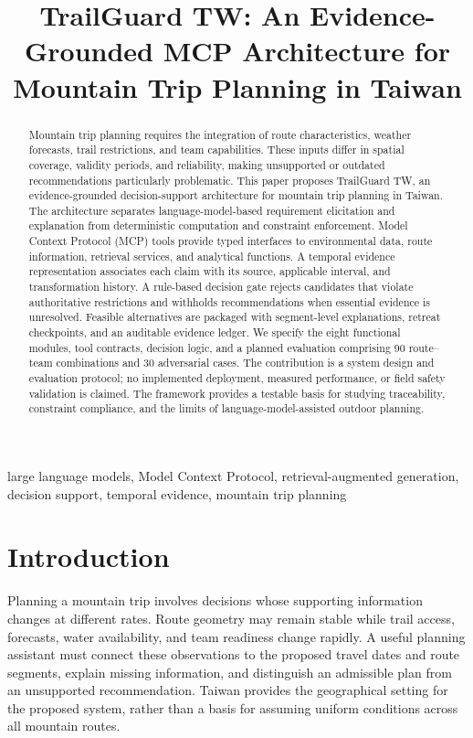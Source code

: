 \documentclass[conference]{IEEEtran}
\begin{document}
\title{TrailGuard TW: An Evidence-Grounded MCP Architecture for Mountain Trip Planning in Taiwan}
\author{
}
\maketitle
\begin{abstract}
Mountain trip planning requires the integration of route characteristics, weather forecasts, trail restrictions, and team capabilities. These inputs differ in spatial coverage, validity periods, and reliability, making unsupported or outdated recommendations particularly problematic. This paper proposes TrailGuard TW, an evidence-grounded decision-support architecture for mountain trip planning in Taiwan. The architecture separates language-model-based requirement elicitation and explanation from deterministic computation and constraint enforcement. Model Context Protocol (MCP) tools provide typed interfaces to environmental data, route information, retrieval services, and analytical functions. A temporal evidence representation associates each claim with its source, applicable interval, and transformation history. A rule-based decision gate rejects candidates that violate authoritative restrictions and withholds recommendations when essential evidence is unresolved. Feasible alternatives are packaged with segment-level explanations, retreat checkpoints, and an auditable evidence ledger. We specify the eight functional modules, tool contracts, decision logic, and a planned evaluation comprising 90 route--team combinations and 30 adversarial cases. The contribution is a system design and evaluation protocol; no implemented deployment, measured performance, or field safety validation is claimed. The framework provides a testable basis for studying traceability, constraint compliance, and the limits of language-model-assisted outdoor planning.
\end{abstract}
\begin{IEEEkeywords}
large language models, Model Context Protocol, retrieval-augmented generation, decision support, temporal evidence, mountain trip planning
\end{IEEEkeywords}

\section{Introduction}
Planning a mountain trip involves decisions whose supporting information changes at different rates. Route geometry may remain stable while trail access, forecasts, water availability, and team readiness change rapidly. A useful planning assistant must connect these observations to the proposed travel dates and route segments, explain missing information, and distinguish an admissible plan from an unsupported recommendation. Taiwan provides the geographical setting for the proposed system, rather than a basis for assuming uniform conditions across all mountain routes.
\end{document}
